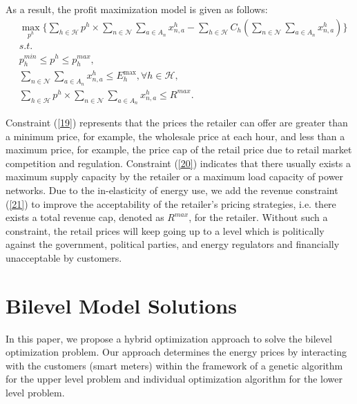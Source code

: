 \documentclass[10pt,journal]{IEEEtran}
\theoremstyle{definition}
\theoremstyle{plain} \newtheorem{theo}{Theorem} \newtheorem{prop}{Proposition}  \newtheorem{lemm}{Lemma}
\begin{document}
As a result, the profit maximization model is given as follows:
\begin{align}
&\underset{p^h} {\operatorname{\max}} \{ \sum\limits_{h \in \mathcal{H}} {{p^h}}\times\sum\limits_{n \in \mathcal{N}} {\sum\limits_{a \in {A_n}} {x_{n,a}^h} } - \sum\limits_{h \in \mathcal{H}} {{C_h}(\sum\limits_{n \in \mathcal{N}} {\sum\limits_{a \in {A_n}} {x_{n,a}^h} } )\} } \label{18} \\
&s.t. \nonumber \\
&p_h^{min} \leq p^h \leq p_h^{max}, \label{19}\\
&\sum\limits_{n \in \mathcal{N}} {\sum\limits_{a \in {A_n}} {x_{n,a}^h} }  \le E_h^{\max },\forall h \in \mathcal{H} , \label{20}\\
& \sum\limits_{h \in \mathcal{H}} {{p^h}}\times\sum\limits_{n \in \mathcal{N}} {\sum\limits_{a \in {A_n}} {x_{n,a}^h} } \leq R^{max} \label{21}. 
  \end{align}

Constraint (\ref{19}) represents that the prices the retailer can offer are greater than a minimum price, for example, the wholesale price at each hour, and less than a maximum price, for example, the price cap of the retail price due to retail market competition and regulation. Constraint (\ref{20}) indicates that there usually exists a maximum supply capacity by the retailer or a maximum load capacity of power networks. Due to the in-elasticity of energy use, we add the revenue constraint (\ref{21}) to improve the  acceptability of the retailer's pricing strategies, i.e. there exists a total revenue cap, denoted as $ R^{max}$, for the retailer. Without such a constraint, the retail prices will keep going up to a level which is politically against the government, political parties, and energy regulators and financially unacceptable by customers. 



\section{Bilevel Model Solutions} \label{model_solution}



In this paper, we propose a hybrid optimization approach to solve the bilevel optimization problem. Our approach determines the energy prices by interacting with the customers (smart meters) within the framework of a genetic algorithm for the upper level problem and individual optimization algorithm for the lower level problem. 
\end{document}
